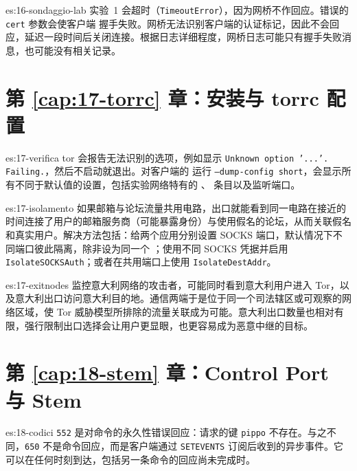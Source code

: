 \begin{soluzione}{es:16-sondaggio-lab}
实验~1 会超时（\texttt{TimeoutError}），因为网桥不作回应。错误的 \texttt{cert} 参数会使客户端  握手失败。网桥无法识别客户端的认证标记，因此不会回应，延迟一段时间后关闭连接。根据日志详细程度，网桥日志可能只有握手失败消息，也可能没有相关记录。
\end{soluzione}

\section*{第 \ref{cap:17-torrc} 章：安装与 torrc 配置}

\begin{soluzione}{es:17-verifica}
tor 会报告无法识别的选项，例如显示 \texttt{Unknown option '...'. Failing.}，然后不启动就退出。对客户端的  运行 \texttt{--dump-config short}，会显示所有不同于默认值的设置，包括实验网络特有的 、 条目以及监听端口。
\end{soluzione}

\begin{soluzione}{es:17-isolamento}
如果邮箱与论坛流量共用电路，出口就能看到同一电路在接近的时间连接了用户的邮箱服务商（可能暴露身份）与使用假名的论坛，从而关联假名和真实用户。解决方法包括：给两个应用分别设置 SOCKS 端口，默认情况下不同端口彼此隔离，除非设为同一个 ；使用不同 SOCKS 凭据并启用 \texttt{IsolateSOCKSAuth}；或者在共用端口上使用 \texttt{IsolateDestAddr}。
\end{soluzione}

\begin{soluzione}{es:17-exitnodes}
监控意大利网络的攻击者，可能同时看到意大利用户进入 Tor，以及意大利出口访问意大利目的地。通信两端于是位于同一个司法辖区或可观察的网络区域，使 Tor 威胁模型所排除的流量关联成为可能。意大利出口数量也相对有限，强行限制出口选择会让用户更显眼，也更容易成为恶意中继的目标。
\end{soluzione}

\section*{第 \ref{cap:18-stem} 章：Control Port 与 Stem}

\begin{soluzione}{es:18-codici}
\texttt{552} 是对命令的永久性错误回应：请求的键 \texttt{pippo} 不存在。与之不同，\texttt{650} 不是命令回应，而是客户端通过 \texttt{SETEVENTS} 订阅后收到的异步事件。它可以在任何时刻到达，包括另一条命令的回应尚未完成时。
\end{soluzione}

